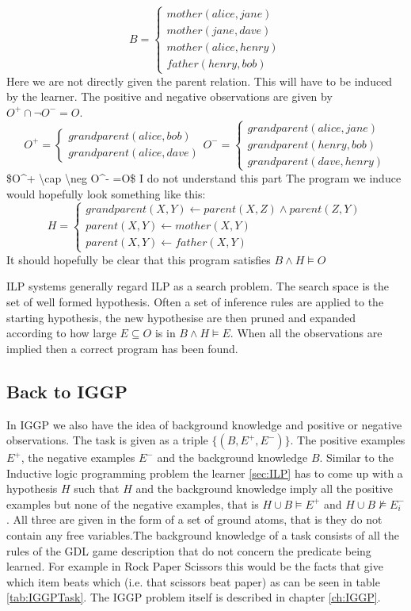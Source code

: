 \[
B=
\begin{cases}
mother(alice,jane)\\
mother(jane,dave)\\
mother(alice,henry)\\
father(henry,bob)
\end{cases}
\]
Here we are not directly given the parent relation. This will have to be induced by the learner. The positive and negative observations are given by $O^+ \cap \neg O^- = O$.
\[
O^+=
\begin{cases}
grandparent(alice,bob)\\
grandparent(alice,dave)
\end{cases}
O^-=
\begin{cases}
grandparent(alice,jane)\\
grandparent(henry,bob)\\
grandparent(dave,henry)
\end{cases}
\]
\ac{$O^+ \cap \neg O^- =O$ I do not understand this part}
The program we induce would hopefully look something like this:
\[H=\begin{cases}
grandparent(X,Y) \leftarrow parent(X,Z) \wedge parent(Z,Y)\\
parent(X,Y) \leftarrow mother(X,Y)\\
parent(X,Y) \leftarrow father(X,Y)
\end{cases}\]
It should hopefully be clear that this program satisfies $B \wedge H \vDash O$

ILP systems generally regard ILP as a search problem. The search space is the set of well formed hypothesis. Often a set of inference rules are applied to the starting hypothesis, the new hypothesise are then pruned and expanded according to how large $E\subseteq O$ is in $B \wedge H \vDash E$. When all the observations are implied then a correct program has been found.

\subsection{Back to IGGP}

In IGGP we also have the idea of background knowledge and positive or negative observations. The task is given as a triple $\{(B,E^+,E^-)\}$. The positive examples $E^+$, the negative examples  $E^-$ and the background knowledge $B$. Similar to the Inductive logic programming problem the learner \ref{sec:ILP} has to come up with a hypothesis $H$ such that $H$ and the background knowledge imply all the positive examples but none of the negative examples, that is $H \cup B \models E^+$ and $H \cup B \not\models E_i^-$. All three are given in the form of a set of ground atoms, that is they do not contain any free variables.The background knowledge of a task consists of all the rules of the GDL game description that do not concern the predicate being learned. For example in Rock Paper Scissors this would be the facts that give which item beats which (i.e. that scissors beat paper) as can be seen in table \ref{tab:IGGPTask}. The IGGP problem itself is described in chapter \ref{ch:IGGP}.

